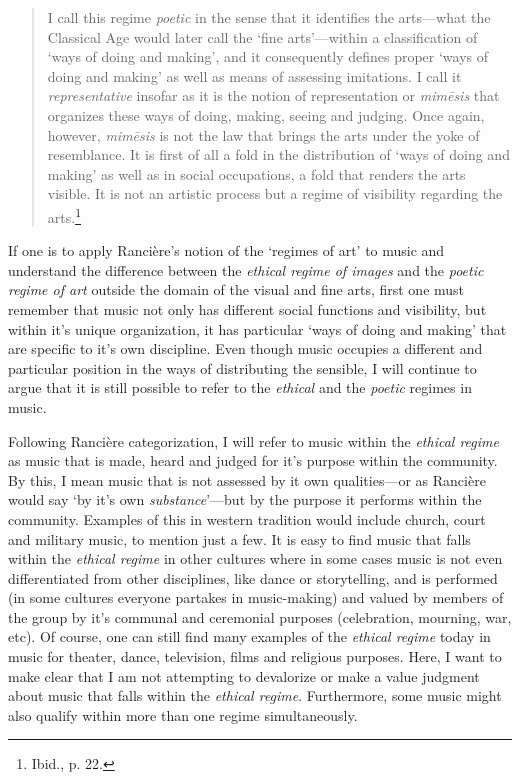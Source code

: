 \begin{quote}
I call this regime \emph{poetic} in the sense that it identifies the arts---what the Classical Age would later call the `fine arts'---within a classification of `ways of doing and making', and it consequently defines proper `ways of doing and making' as well as means of assessing imitations. I call it \emph{representative} insofar as it is the notion of representation or \emph{mim\={e}sis} that organizes these ways of doing, making, seeing and judging. Once again, however, \emph{mim\={e}sis} is not the law that brings the arts under the yoke of resemblance. It is first of all a fold in the distribution of `ways of doing and making' as well as in social occupations, a fold that renders the arts visible. It is not an artistic process but a regime of visibility regarding the arts.\footnote{Ibid., p. 22.}
\end{quote}

If one is to apply Ranci\`{e}re's notion of the `regimes of art' to music and understand the difference between the \emph{ethical regime of images} and the \emph{poetic regime of art} outside the domain of the visual and fine arts, first one must remember that music not only has different social functions and visibility, but within it's unique organization, it has particular `ways of doing and making' that are specific to it's own discipline. Even though music occupies a different and particular position in the ways of distributing the sensible, I will continue to argue that it is still possible to refer to the \emph{ethical} and the \emph{poetic} regimes in music. 

Following Ranci\`{e}re categorization, I will refer to music within the \emph{ethical regime} as music that is made, heard and judged for it's purpose within the community. By this, I mean music that is not assessed by it own qualities---or as Ranci\`{e}re would say `by it's own \emph{substance}'---but by the purpose it performs within the community. Examples of this in western tradition would include church, court and military music, to mention just a few. It is easy to find music that falls within the \emph{ethical regime} in other cultures where in some cases music is not even differentiated from other disciplines, like dance or storytelling, and is performed (in some cultures everyone partakes in music-making) and valued by members of the group by it's communal and ceremonial purposes (celebration, mourning, war, etc). Of course, one can still find many examples of the \emph{ethical regime} today in music for theater, dance, television, films and religious purposes. Here, I want to make clear that I am not attempting to devalorize or make a value judgment about music that falls within the \emph{ethical regime}. Furthermore, some music might also qualify within more than one regime simultaneously.

